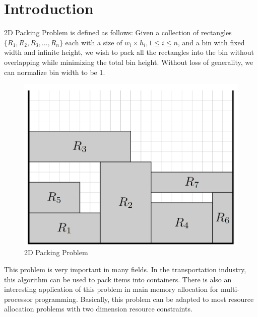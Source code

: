 \documentclass[sigplan,screen,nonacm]{acmart}\settopmatter{printfolios=true,printccs=false,printacmref=false}
\begin{document}
\maketitle

\section{Introduction}
2D Packing Problem is defined as follows: Given a collection of rectangles $\{R_1,R_2,R_3,\dots,R_n\}$ each with a size of $w_i\times h_i, 1\leq i\leq n$, and a bin with fixed width and infinite height, we wish to pack all the rectangles into the bin without overlapping while minimizing the total bin height\cite{baker1980orthogonal}. Without loss of generality, we can normalize bin width to be 1.\par
\begin{figure}[htbp]
  \centering
  \includegraphics[scale=0.5]{2dpacking}
  \caption{2D Packing Problem}
  \label{fig:2dpacking}
\end{figure}
This problem is very important in many fields. In the transportation industry, this algorithm can be used to pack items into containers. There is also an interesting application of this problem in main memory allocation for multi-processor programming. Basically, this problem can be adapted to most resource allocation problems with two dimension resource constraints.\par
\end{document}
